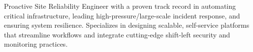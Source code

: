 \begin{cvparagraph}

Proactive Site Reliability Engineer with a proven track record in automating critical infrastructure, leading
high-pressure/large-scale incident response, and ensuring system resilience. Specializes in designing scalable,
self-service platforms that streamline workflows and integrate cutting-edge shift-left security and monitoring
practices.

\end{cvparagraph}
